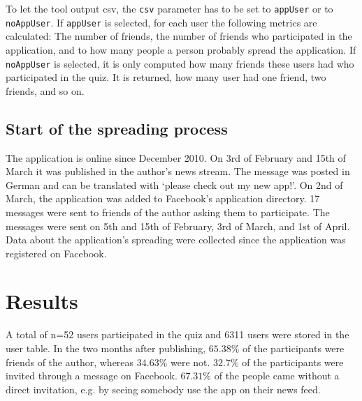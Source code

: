 \documentclass[preprint,12pt]{elsarticle}
\begin{document}
To let the tool output \ac{csv}, the \verb|csv| parameter has to be
set to \verb|appUser| or to \verb|noAppUser|. 
If \verb|appUser| is selected, for each user the following metrics are
calculated: The number of friends, the number of friends who
participated in the application, and to how many people a person
probably spread the application.  If \verb|noAppUser| is selected, it
is only computed how many friends these users had who participated in
the quiz. It is returned, how many user had one friend, two friends,
and so on.



\subsection{Start of the spreading process}
\label{sec:start-spre-proc}
The application is online since December 2010. On 3rd of February
and 15th of March it was  published in the author's news stream. The
message was posted in German and can be translated with `please check
out my new app!'. On 2nd of March, the application was added to
Facebook's application directory. 17 messages were sent to friends of
the author asking them to participate. The messages were sent on
5th and 15th of February, 3rd of March, and 1st of April. Data
about the application's spreading were collected since the application
was registered on Facebook.


\section{Results}
\label{sec:results}
A total of n=52 users participated in the quiz and 6311 users were
stored in the user table. In the two months after publishing, $65.38
\%$ of the participants were friends of the author, whereas $34.63 \%$
were not. $32.7 \%$ of the participants were invited through a message on 
Facebook. $67.31 \%$ of the people came without a direct invitation,
e.g. by seeing somebody use the app on their news feed.
\end{document}
